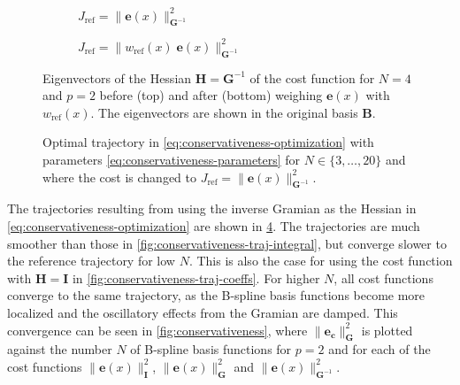 \begin{figure}
    \begin{subfigure}{\textwidth}
        \centering
        
        \caption{$J_\text{ref} = \|\mathbf e(x)\|_{\mathbf G^{-1}}^2$}
        \label{fig:conservativeness-eigenvectors-inv-gramian}
    \end{subfigure}
    \begin{subfigure}{\textwidth}
        \centering
        
        \caption{$J_\text{ref} = \|w_\text{ref}(x)\;\mathbf e(x)\|_{\mathbf G^{-1}}^2$}
        \label{fig:conservativeness-eigenvectors-weight-inv-gramian}
    \end{subfigure}
    \caption{Eigenvectors of the Hessian $\mathbf H = \mathbf G^{-1}$ of the cost function for $N=4$ and $p=2$ before (top) and after (bottom) weighing $\mathbf e(x)$ with $w_\text{ref}(x)$. The eigenvectors are shown in the original basis $\mathbf B$.}
    \label{fig:conservativeness-eigenvectors-inv-gramian-full}
\end{figure}

\begin{figure}
    \centering
    
    \caption{Optimal trajectory in \cref{eq:conservativeness-optimization} with parameters \cref{eq:conservativeness-parameters} for $N\in\{3,\ldots,20\}$ and where the cost is changed to $J_\text{ref} = \|\mathbf e(x)\|_{\mathbf G^{-1}}^2$.}
    \label{fig:conservativeness-traj-inv-gramian}
\end{figure}

The trajectories resulting from using the inverse Gramian as the Hessian in \cref{eq:conservativeness-optimization} are shown in \cref{fig:conservativeness-traj-inv-gramian}. The trajectories are much smoother than those in \cref{fig:conservativeness-traj-integral}, but converge slower to the reference trajectory for low $N$. This is also the case for using the cost function with $\mathbf H = \mathbf I$ in \cref{fig:conservativeness-traj-coeffs}. For higher $N$, all cost functions converge to the same trajectory, as the B-spline basis functions become more localized and the oscillatory effects from the Gramian are damped. This convergence can be seen in \cref{fig:conservativeness}, where $\|\mathbf e_\mathbf c\|_\mathbf G^2$ is plotted against the number $N$ of B-spline basis functions for $p=2$ and for each of the cost functions $\|\mathbf e(x)\|_\mathbf I^2$, $\|\mathbf e(x)\|_\mathbf G^2$ and $\|\mathbf e(x)\|_{\mathbf G^{-1}}^2$.


